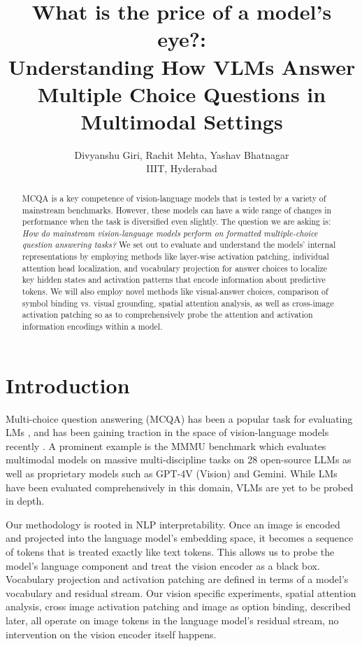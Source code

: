 \documentclass[11pt]{article}
\title{What is the price of a model's eye?:\\ Understanding How VLMs Answer Multiple Choice Questions in Multimodal Settings}
\author{Divyanshu Giri, Rachit Mehta, Yashav Bhatnagar \\
        IIIT, Hyderabad}
\begin{document}
\maketitle
\begin{abstract}
MCQA is a key competence of vision-language models that is tested by a variety of mainstream benchmarks. However, these models can have a wide range of changes in performance when the task is diversified even slightly. The question we are asking is: \textit{How do mainstream vision-language models perform on formatted multiple-choice question answering tasks?} We set out to evaluate and understand the models' internal representations by employing methods like layer-wise activation patching, individual attention head localization, and vocabulary projection for answer choices to localize key hidden states and activation patterns that encode information about predictive tokens. We will also employ novel methods like visual-answer choices, comparison of symbol binding vs. visual grounding, spatial attention analysis, as well as cross-image activation patching so as to comprehensively probe the attention and activation information encodings within a model.
\end{abstract}

\section{Introduction}

Multi-choice question answering (MCQA) has been a popular task for evaluating LMs \cite{wiegreffe2025answerassembleaceunderstanding}, and has been gaining traction in the space of vision-language models recently \cite{meng2024mmiumultimodalmultiimageunderstanding}. A prominent example is the MMMU benchmark \cite{yue2024mmmumassivemultidisciplinemultimodal} which evaluates multimodal models on massive multi-discipline tasks on 28 open-source LLMs as well as proprietary models such as GPT-4V (Vision) and Gemini. While LMs have been evaluated comprehensively in this domain, VLMs are yet to be probed in depth.

Our methodology is rooted in NLP interpretability. Once an image is encoded and projected into the language model’s embedding space, it becomes a sequence of tokens that is treated exactly like text tokens. This allows us to probe the model’s language component and treat the vision encoder as a black box. Vocabulary projection and activation patching are defined in terms of a model’s vocabulary and residual stream. Our vision specific experiments, spatial attention analysis, cross image activation patching and image as option binding, described later, all operate on image tokens in the language model’s residual stream, no intervention on the vision encoder itself happens. 
\end{document}

